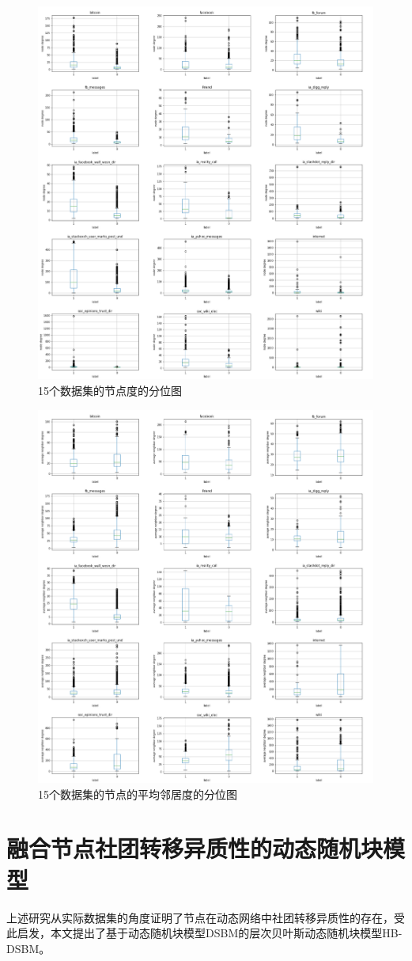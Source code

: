 \begin{figure}[!htbp]
 	\centering
 	\setlength{\abovecaptionskip}{0pt} 
 	\setlength{\belowcaptionskip}{10pt} 
 	\includegraphics[width=.6\textwidth]{figures/chap03/figure/alldata-DG.pdf}
 	\caption{15个数据集的节点度的分位图}
 	\label{fig.3.4}
 \end{figure}

 \begin{figure}[!htbp]
 	\centering
 	\setlength{\abovecaptionskip}{0pt} 
 	\setlength{\belowcaptionskip}{10pt} 
 	\includegraphics[width=.6\textwidth]{figures/chap03/figure/alldata-aND.pdf}
 	\caption{15个数据集的节点的平均邻居度的分位图}
 	\label{fig.3.5}
 \end{figure}



\section{融合节点社团转移异质性的动态随机块模型}
上述研究从实际数据集的角度证明了节点在动态网络中社团转移异质性的存在，受此启发，本文提出了基于动态随机块模型DSBM的层次贝叶斯动态随机块模型HB-DSBM。


